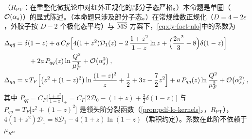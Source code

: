 \begin{proposition}\label{prop:dy-nlo}
（$R_{\mathrm{PT}}$：在重整化微扰论中对红外正规化的部分子态严格。）本命题是单圈（$\mathcal{O}\!\left(\alpha_s\right)$）的显式陈述。（本命题只涉及部分子态。）在常规维数正规化（$D=4-2\varepsilon$，外胶子按 $D-2$ 个极化态平均）与 $\overline{\mathrm{MS}}$ 方案下，\cref{eq:dy-fact-nlo}中的系数为
\begin{align}
\Delta_{q\bar q}&=\delta(1-z)+a\,C_F\Big[4(1+z^2)\mathcal D_1(z)-2\,\frac{1+z^2}{1-z}\ln z+\Big(\frac{2\pi^2}{3}-8\Big)\delta(1-z)\Big]\nonumber\\
&\qquad+2a\,P_{qq}(z)\ln\frac{Q^2}{\mu_F^2}+\mathcal{O}\!\left(\alpha_s^2\right),\label{eq:dy-Dqq}\\
\Delta_{qg}&=a\,T_F\Big[\big(z^2+(1-z)^2\big)\ln\frac{(1-z)^2}{z}+\frac12+3z-\frac72z^2\Big]+a\,P_{qg}(z)\ln\frac{Q^2}{\mu_F^2}+\mathcal{O}\!\left(\alpha_s^2\right),\label{eq:dy-Dqg}
\end{align}
其中 $P_{qq}=C_F\big[\frac{1+z^2}{1-z}\big]_+=C_F\big[2\mathcal D_0-(1+z)+\frac32\delta(1-z)\big]$ 与 $P_{qg}=T_F\big[z^2+(1-z)^2\big]$ 是领头阶分裂函数（\cref{prop:pdf-lo-kernels}，\tagR，$R_{\mathrm{PT}}$），$4(1+z^2)\mathcal D_1=8\mathcal D_1-4(1+z)\ln(1-z)$（乘积约定）。系数在此阶不依赖于 $\mu_R$。
\end{proposition}

